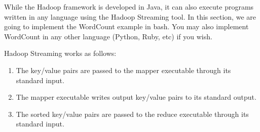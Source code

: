 \documentclass[11pt]{article}
\begin{document}
While the Hadoop framework is developed in Java, it can also execute
programs written in any language using the Hadoop Streaming tool. In
this section, we are going to implement the WordCount example in
bash. You may also implement WordCount in any other language (Python,
Ruby, etc) if you wish.

Hadoop Streaming works as follows:
\begin{enumerate}
\item The key/value pairs are passed to the mapper executable through its standard input.
\item The mapper executable writes output key/value pairs to its standard output.
\item The sorted key/value pairs are passed to the reduce executable
  through its standard input.
\end{enumerate}
\end{document}
